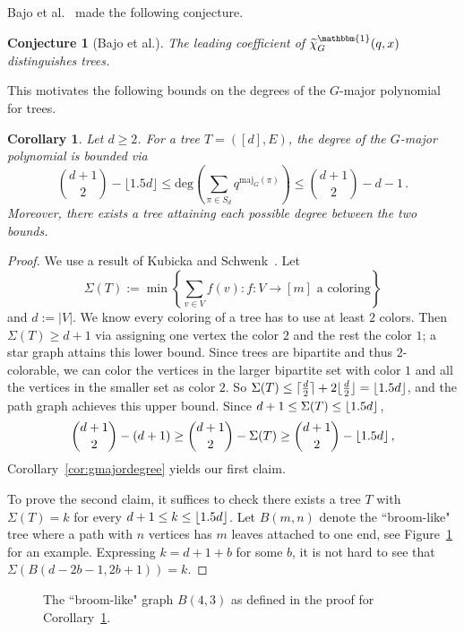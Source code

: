 \documentclass[11pt]{amsart}
\newtheorem{corollary}[theorem]{Corollary}
\newtheorem{conjecture}[theorem]{Conjecture}
\newcommand{\maj}{\mathrm{maj}}
\DeclarePairedDelimiter\ceil{\lceil}{\rceil}
\DeclarePairedDelimiter\floor{\lfloor}{\rfloor}
\begin{document}
Bajo et al.~\cite{qchromatic} made the following conjecture.

\begin{conjecture}[Bajo et al.]\label{conj:tildechitrees}
The leading coefficient of $\widetilde{\chi}_G^\mathbbm{1}(q,x)$ distinguishes trees.
\end{conjecture}

This motivates the following bounds on the degrees of the $G$-major polynomial for trees. 

\begin{corollary}\label{cor:treegmajordegree}
    Let $d \geq 2$. For a tree $T =([d],E)$, the degree of the $G$-major polynomial is bounded via
    \[
        \binom{d+1}{2} - \lfloor{1.5 d}\rfloor \leq 
        \mathrm{deg}\left(\sum_{\pi \in S_d} q^{\maj_G(\pi)}\right) \leq \binom{d+1}{2} - d -1 \, .
    \]
    Moreover, there exists a tree attaining each possible degree between the two bounds.
\end{corollary}
\begin{proof}
    We use a result of Kubicka and Schwenk~\cite[Theorem~3]{chromaticsums}.
    Let 
    \[
        \Sigma(T) := \min\left\{ \sum_{v \in V} f(v): f:V \to [m] \text{ a coloring} \right\}
    \]
    and $d := |V|$.
    We know every coloring of a tree has to use at least $2$ colors. 
    Then $\Sigma(T) \geq d+1$ via assigning one vertex the color $2$ and the rest the color $1$; a star graph attains this lower bound.
    Since trees are bipartite and thus $2$-colorable, we can color the vertices in the larger bipartite set with color $1$ and all the vertices in the smaller set as color $2$.
    So $\Sigma(T) \leq \ceil{\frac{d}{2}}+2 \floor{\frac{d}{2}} = \floor{1.5 d}$, and the path graph achieves this upper bound.
    Since $d+1 \leq \Sigma(T) \leq \floor{1.5 d}$,
    \[
        \binom{d+1}{2} - (d+1) \geq \binom{d+1}{2} - \Sigma(T) \geq \binom{d+1}{2} - \floor{1.5 d} \, ,
    \]
    Corollary~\ref{cor:gmajordegree} yields our first claim.
    
    To prove the second claim, it suffices to check there exists a tree $T$ with $\Sigma(T)=k$ for every $d+1 \leq k \leq \floor{1.5 d}$. 
    Let $B(m,n)$ denote the ``broom-like" tree where a path with $n$ vertices has $m$ leaves attached to one end, see Figure~\ref{fig:broomlikegraph} for an example. 
    Expressing $k=d+1+b$ for some $b$, it is not hard to
see that $\Sigma(B(d-2b-1,2b+1)) = k$.
\end{proof}

\begin{figure}
    
    \caption{The ``broom-like" graph $B(4,3)$ as defined in the proof for Corollary~\ref{cor:treegmajordegree}.}\label{fig:broomlikegraph}
\end{figure}
\end{document}
